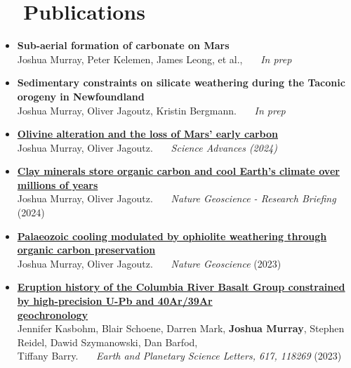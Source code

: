 \documentclass[letterpaper,20pt]{article}
\newcommand{\resumeItem}[2]{
  \item\normalsize{
    \textbf{#1}{ #2 \vspace{-2pt}}
  }
}
\newcommand{\resumeSubHeadingListStart}{\begin{itemize}[leftmargin=*]}
\newcommand{\resumeSubHeadingListEnd}{\end{itemize}}
\begin{document}
\section{~~Publications}
  \resumeSubHeadingListStart
    \resumeItem
    {Sub-aerial formation of carbonate on Mars}
    {\\Joshua Murray, Peter Kelemen, James Leong, et al.,~~~ \textit{In prep}}
    \resumeItem
    {Sedimentary constraints on silicate weathering during the Taconic orogeny in Newfoundland}
    {\\Joshua Murray, Oliver Jagoutz, Kristin Bergmann.~~~ \textit{In prep}}
    \resumeItem
    {\href{https://www.science.org/doi/10.1126/sciadv.adm8443}
    {Olivine alteration and the loss of Mars' early carbon}}{\\Joshua Murray, Oliver Jagoutz.~~~ \textit{Science Advances (2024)}}
    \resumeItem
    {\href{https://www.nature.com/articles/s41561-023-01353-6}{Clay minerals store organic carbon and cool Earth’s climate over millions of years}}{\\Joshua Murray, Oliver Jagoutz.~~~ \textit{Nature Geoscience - Research Briefing} (2024)}
    \resumeItem
    {\href{https://doi.org/10.1038/s41561-023-01342-9}{Palaeozoic cooling modulated by ophiolite weathering through organic carbon preservation}}{\\Joshua Murray, Oliver Jagoutz.~~~ \textit{Nature Geoscience} (2023)}
    \resumeItem
    {\href{https://doi.org/10.1016/j.epsl.2023.118269}{Eruption history of the Columbia River Basalt Group constrained by high-precision U-Pb and 40Ar/39Ar\\ geochronology}}{\\Jennifer Kasbohm, Blair Schoene, Darren Mark, \textbf{Joshua Murray}, Stephen Reidel, Dawid Szymanowski, Dan Barfod,\\ Tiffany Barry.~~~ \textit{Earth and Planetary Science Letters, 617, 118269} (2023)}
\resumeSubHeadingListEnd

\vspace{3pt}
\end{document}
